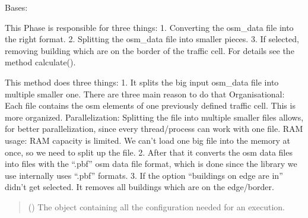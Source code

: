 \documentclass[letterpaper,10pt,english]{sphinxmanual}
\begin{document}
\begin{fulllineitems}
\label{\detokenize{apidoc/src.osm_configurator.model.project.calculation:src.osm_configurator.model.project.calculation.geo_data_phase.GeoDataPhase}}
\pysigstartsignatures
{}
\pysigstopsignatures
\sphinxAtStartPar
Bases: {\hyperref[\detokenize{apidoc/src.osm_configurator.model.project.calculation:src.osm_configurator.model.project.calculation.calculation_phase_interface.ICalculationPhase}]{}}

\sphinxAtStartPar
This Phase is responsible for three things:
1. Converting the osm\_data file into the right format.
2. Splitting the osm\_data file into smaller pieces.
3. If selected, removing building which are on the border of the traffic cell.
For details see the method calculate().

\begin{fulllineitems}
\label{\detokenize{apidoc/src.osm_configurator.model.project.calculation:src.osm_configurator.model.project.calculation.geo_data_phase.GeoDataPhase.calculate}}
\pysigstartsignatures
{}
\pysigstopsignatures
\sphinxAtStartPar
This method does three things:
1. It splits the big input osm\_data file into multiple smaller one. There are three main reason to do that
\sphinxhyphen{} Organisational: Each file contains the osm elements of one previously defined traffic cell.
This is more organized.
\sphinxhyphen{} Parallelization: Splitting the file into multiple smaller files allows, for better
parallelization, since every thread/process can work with one file.
\sphinxhyphen{} RAM usage: RAM capacity is limited. We can’t load one big file into the memory at once,
so we need to split up the file.
2. After that it converts the osm data files into files with the “.pbf” osm data file format, which is done
since the library we use internally uses “.pbf” formats.
3. If the option “buildings on edge are in” didn’t get selected.
It removes all buildings which are on the edge/border.
\begin{quote}\begin{description}
\sphinxAtStartPar
{} ({\hyperref[\detokenize{apidoc/src.osm_configurator.model.project.configuration:src.osm_configurator.model.project.configuration.configuration_manager.ConfigurationManager}]{}}) \textendash{} The object containing all the configuration needed for an execution.


\end{description}
\end{quote}
\end{fulllineitems}
\end{fulllineitems}
\end{document}
